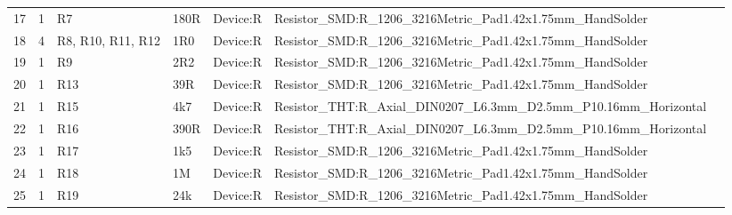 \documentclass[letterpaper,twocolumn,10pt]{article}
\begin{document}
\begin{sidewaystable*}[ht]
{\begin{tabular}{cclllll}
      17                     & 1                                                        & R7                     & 180R                   & Device:R                         & Resistor\_SMD:R\_1206\_3216Metric\_Pad1.42x1.75mm\_HandSolder                                           \\
      18                     & 4                                                        & R8, R10, R11, R12      & 1R0                    & Device:R                         & Resistor\_SMD:R\_1206\_3216Metric\_Pad1.42x1.75mm\_HandSolder                                           \\
      19                     & 1                                                        & R9                     & 2R2                    & Device:R                         & Resistor\_SMD:R\_1206\_3216Metric\_Pad1.42x1.75mm\_HandSolder                                           \\
      20                     & 1                                                        & R13                    & 39R                    & Device:R                         & Resistor\_SMD:R\_1206\_3216Metric\_Pad1.42x1.75mm\_HandSolder                                           \\
      21                     & 1                                                        & R15                    & 4k7                    & Device:R                         & Resistor\_THT:R\_Axial\_DIN0207\_L6.3mm\_D2.5mm\_P10.16mm\_Horizontal                                   \\
      22                     & 1                                                        & R16                    & 390R                   & Device:R                         & Resistor\_THT:R\_Axial\_DIN0207\_L6.3mm\_D2.5mm\_P10.16mm\_Horizontal                                   \\
      23                     & 1                                                        & R17                    & 1k5                    & Device:R                         & Resistor\_SMD:R\_1206\_3216Metric\_Pad1.42x1.75mm\_HandSolder                                           \\
      24                     & 1                                                        & R18                    & 1M                     & Device:R                         & Resistor\_SMD:R\_1206\_3216Metric\_Pad1.42x1.75mm\_HandSolder                                           \\
      25                     & 1                                                        & R19                    & 24k                    & Device:R                         & Resistor\_SMD:R\_1206\_3216Metric\_Pad1.42x1.75mm\_HandSolder                                           \\

\end{tabular}}
\end{sidewaystable*}
\end{document}
